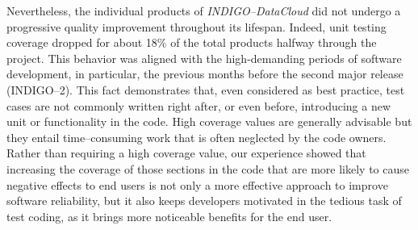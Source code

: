 Nevertheless, the individual products of {\sl INDIGO--DataCloud} did not undergo 
a progressive quality improvement throughout its lifespan. Indeed,
unit testing coverage dropped for about 18\% of the total products halfway through
the project. This behavior was aligned with the high-demanding periods of software
development, in particular, the previous months before the second major release 
(INDIGO--2). This fact demonstrates that, even considered as best practice, test 
cases are not commonly written right after, or even before, introducing a new unit
or functionality in the code. High coverage values are generally advisable but they
entail time--consuming work that is often neglected by the code owners. Rather than
requiring a high coverage value, our experience showed that increasing the coverage
of those sections in the code that are more likely to cause negative effects to end
users is not only a more effective approach to improve software reliability, but it 
also keeps developers motivated in the tedious task of test coding, as it brings more 
noticeable benefits for the end user.


